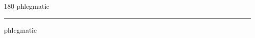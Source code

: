 
\begin{frame}
\begin{center}
\begin{turn}{180}
{\fontsize{2.5cm}{1em}\selectfont phlegmatic}
\end{turn}
\vspace{1em}\par  
\hrule
\vspace{1em}\par  
{\fontsize{2.5cm}{1em}\selectfont phlegmatic}
\end{center}
\end{frame}
